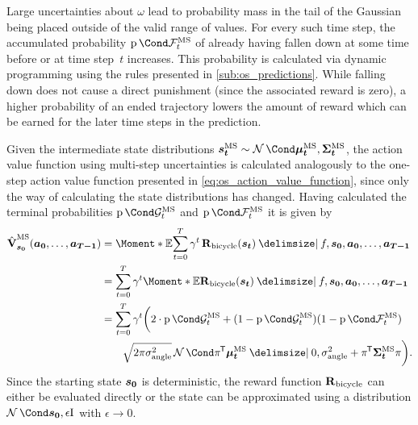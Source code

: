 Large uncertainties about $\omega$ lead to probability mass in the tail of the Gaussian being placed outside of the valid range of values.
For every such time step, the accumulated probability $\Prob{\ms{\PFallen}_t}$ of already having fallen down at some time before or at time step~$t$ increases.
This probability is calculated via dynamic programming using the rules presented in \cref{sub:os_predictions}.
While falling down does not cause a direct punishment (since the associated reward is zero), a higher probability of an ended trajectory lowers the amount of reward which can be earned for the later time steps in the prediction.

Given the intermediate state distributions $\ms{\rv{s_t}} \sim \Gaussian{\ms{\mat{\mu_t}}, \ms{\mat{\Sigma_t}}}$, the action value function using multi-step uncertainties is calculated analogously to the one-step action value function presented in \cref{eq:os_action_value_function}, since only the way of calculating the state distributions has changed.
Having calculated the terminal probabilities $\Prob{\ms{\PGoal_t}}$ and $\Prob{\ms{\PFallen_t}}$ it is given by
\begin{align}
    \label{eq:ms_action_value_function}
    \begin{split}
        \ms{\AVlu}_{\mat{s_0}}(\mat{a_0}, \dots, \mat{a_{T-1}}) &= \Moment*{\E}{\sum_{t=0}^T \gamma^t \RwdBicycle(\mat{s_t}) \given f, \mat{s_0}, \mat{a_0}, \dots, \mat{a_{T-1}}} \\
        &= \sum_{t=0}^T \gamma^t \Moment*{\E}{\RwdBicycle(\mat{s_t}) \given f, \mat{s_0}, \mat{a_0}, \dots, \mat{a_{T-1}}} \\
        &= \sum_{t=0}^T \gamma^t \bigg( 2 \cdot \Prob{\ms{\PGoal}_t} + (1 - \Prob{\ms{\PGoal}_t})(1 - \Prob{\ms{\PFallen}_t}) \\
    &\qquad \sqrt{2\pi\sigma_{\text{angle}}^2} \Gaussian{\pi\tran \ms{\mat{\mu_t}} \given 0, \sigma_{\text{angle}}^2 + \pi\tran \ms{\mat{\Sigma_t}}\pi} \bigg).
    \end{split}
\end{align}
Since the starting state $\bm{s_0}$ is deterministic, the reward function $\operatorname{\operatorname{\mathbf{R}}_{\text{bicycle}}}$ can either be evaluated directly or the state can be approximated using a distribution $\Gaussian{\mat{s_0}, \epsilon\Eye}$ with $\epsilon \to 0$.

